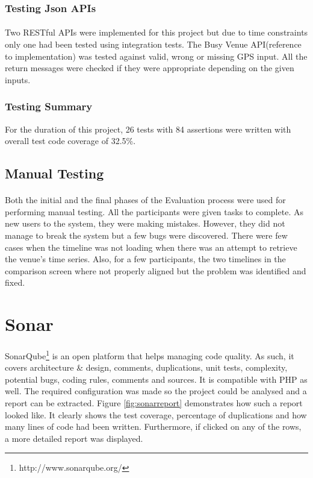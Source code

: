 \documentclass{l4proj}
\begin{document}
\subsubsection{Testing Json APIs}
\paragraph{}
Two RESTful APIs were implemented for this project but due to time constraints only one had been tested using integration tests. The Busy Venue API(reference to implementation) was tested against valid, wrong or missing GPS input. All the return messages were checked if they were appropriate depending on the given inputs.

\subsubsection{Testing Summary}
For the duration of this project, 26 tests with 84 assertions were written with overall test code coverage of 32.5\%.

\subsection{Manual Testing}
\paragraph{}
Both the initial and the final phases of the Evaluation process were used for performing manual testing. All the participants were given tasks to complete. As new users to the system, they were making mistakes. However, they did not manage to break the system but a few bugs were discovered. There were few cases when the timeline was not loading when there was an attempt to retrieve the venue's time series. Also, for a few participants, the two timelines in the comparison screen where not properly aligned but the problem was identified and fixed.

\section{Sonar}
\paragraph{}
SonarQube\footnote{http://www.sonarqube.org/} is an open platform that helps managing code quality. As such, it covers architecture \& design, comments, duplications, unit tests, complexity, potential bugs, coding rules, comments and sources. It is compatible with PHP as well. The required configuration was made so the project could be analysed and a report can be extracted. Figure \ref{fig:sonarreport} demonstrates how such a report looked like. It clearly shows the test coverage, percentage of duplications and how many lines of code had been written. Furthermore, if clicked on any of the rows, a more detailed report was displayed.  
\end{document}
